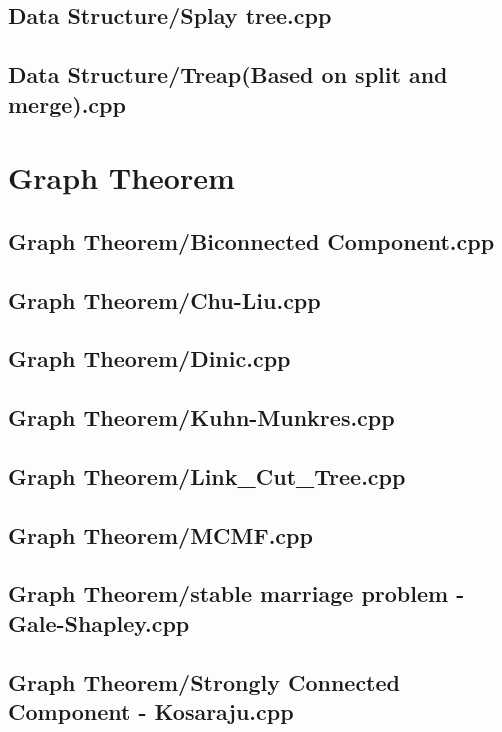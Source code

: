 \documentclass[a4paper,10pt,onecolumn,oneside]{article}
\begin{document}
\subsection{Data Structure/Splay tree.cpp}

\subsection{Data Structure/Treap(Based on split and merge).cpp}

\section{Graph Theorem}
\subsection{Graph Theorem/Biconnected Component.cpp}

\subsection{Graph Theorem/Chu-Liu.cpp}

\subsection{Graph Theorem/Dinic.cpp}

\subsection{Graph Theorem/Kuhn-Munkres.cpp}

\subsection{Graph Theorem/Link\_Cut\_Tree.cpp}

\subsection{Graph Theorem/MCMF.cpp}

\subsection{Graph Theorem/stable marriage problem - Gale-Shapley.cpp}

\subsection{Graph Theorem/Strongly Connected Component - Kosaraju.cpp}

\end{document}
